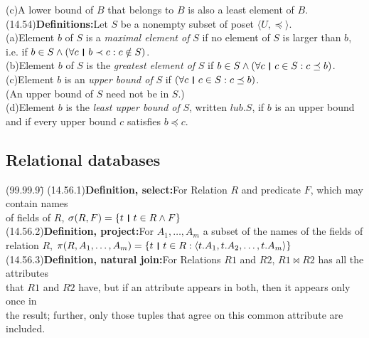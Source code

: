 \documentclass{amsart}
\newcommand{\lgap}{2pt}                             %
\newcommand{\llgap}{6pt}                            %
\newcommand{\thedr}{\rule[-.25ex]{.32mm}{1.75ex}}   %
\newcommand{\dr}{\;\,\thedr\,\;}                    %
\newcommand{\rb}{:}                                 %
\newcommand{\all}{\forall}                          %
\begin{document}
\begin{tabbing}
       \>(c)\>A lower bound of $B$ that belongs to $B$ is also a least element of $B$.\\[\llgap]
(14.54)\>\textbf{Definitions:}\quad Let $S$ be a nonempty subset of poset $\langle U, \preceq\rangle$.\\[\lgap]
       \>(a)\>Element $b$ of $S$ is a \emph{maximal element of} $S$ if no element of $S$ is larger than $b$,\\[\lgap]
       \>   \>i.e. if $b \in S\land (\all c\dr b\prec c\rb c\notin S)$.\\[\lgap]
       \>(b)\>Element $b$ of $S$ is the \emph{greatest element of} $S$ if $b\in S\land (\all c\dr c\in S\rb c\preceq b)$.\\[\lgap]
       \>(c)\>Element $b$ is an \emph{upper bound of} $S$ if $(\all c\dr c\in S\rb c\preceq b)$.\\[\lgap]
       \>   \>(An upper bound of $S$ need not be in $S$.)\\[\lgap]
       \>(d)\>Element $b$ is the \emph{least upper bound of} $S$, written $lub.S$, if $b$ is an upper bound\\[\lgap]
       \>   \>and if every upper bound $c$ satisfies $b\preceq c$.\\[\lgap]
\end{tabbing}

\subsection*{Relational databases}
\begin{tabbing}
(99.99.9)\;\=\kill
(14.56.1)\>\textbf{Definition, select:}\quad For Relation $R$ and predicate $F$, which may contain names\\[\lgap]
       \>of fields of $R$, \quad $\sigma (R,F) = \{ t\dr t \in R \land F \}$\\[\llgap]
(14.56.2)\>\textbf{Definition, project:}\quad For $A_{1}, \ldots, A_{m}$ a subset of the names of the fields of\\[\lgap]
       \>relation $R$, \quad $\pi (R,A_{1}, \ldots, A_{m}) = \{ t \dr t\in R \rb \langle t.A_{1}, t.A_{2}, \ldots, t.A_{m}\rangle\}$\\[\llgap]
(14.56.3)\>\textbf{Definition, natural join:}\quad For Relations $R1$ and $R2$, $R1 \bowtie R2$ has all the attributes\\[\lgap]
       \>that $R1$ and $R2$ have, but if an attribute appears in both, then it appears only once in\\[\lgap]
       \>the result; further, only those tuples that agree on this common attribute are included.\\[\llgap]
\end{tabbing}
\end{document}
